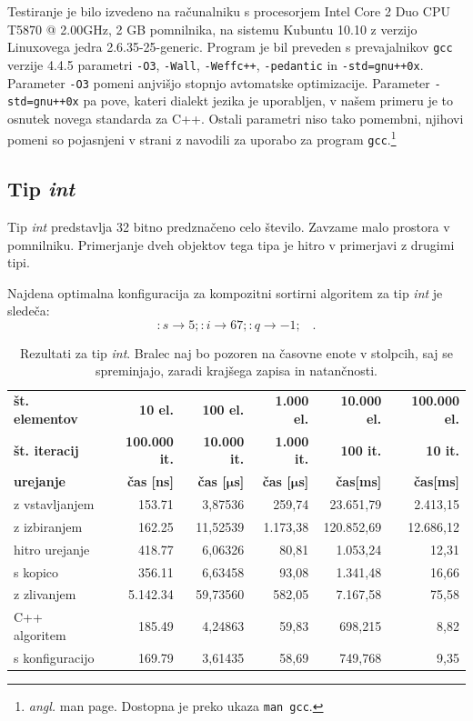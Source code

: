 \documentclass[a4paper,oneside,12pt]{article}
\newcommand{\lra}{\ensuremath{\longrightarrow}}
\newcommand{\edot}{\;\;\;.}
\newcommand{\bmu}{\ensuremath{\boldsymbol{\mu}}}
\newcommand{\usec}{\ensuremath{\bmu}s}
\begin{document}
Testiranje je bilo izvedeno na računalniku s procesorjem Intel\textregistered{} Core\texttrademark{}
2 Duo CPU T5870 @ 2.00GHz, 2 GB pomnilnika, na sistemu Kubuntu 10.10 z verzijo Linuxovega jedra 2.6.35-25-generic.
Program je bil preveden s prevajalnikov \texttt{gcc} verzije 4.4.5 parametri \texttt{-O3},
\texttt{-Wall}, \texttt{-Weffc++}, \texttt{-pedantic} in \texttt{-std=gnu++0x}.
Parameter \texttt{-O3} pomeni anjvišjo stopnjo avtomatske optimizacije. Parameter \texttt{-std=gnu++0x} 
pa pove, kateri dialekt jezika je uporabljen, v našem primeru je to osnutek novega standarda za C++.
Ostali parametri niso tako pomembni, njihovi pomeni so pojasnjeni v strani z navodili za uporabo za program 
\texttt{gcc}.\footnote{\emph{angl.} man page. Dostopna je preko ukaza \texttt{man gcc}.}
 
\subsection{Tip \emph{int}}
Tip \emph{int} predstavlja 32 bitno predznačeno celo število. Zavzame malo prostora v 
pomnilniku. Primerjanje dveh objektov tega tipa je hitro v primerjavi z drugimi tipi.

Najdena optimalna konfiguracija za kompozitni sortirni algoritem za tip \emph{int} je sledeča:
\[ :s \lra 5;:i \lra 67;:q \lra -1; \edot \]

\begin{table}[h]
  \caption[Rezultati za tip \emph{int}]{Rezultati za tip \emph{int}. Bralec naj bo pozoren na časovne enote
  v stolpcih, saj se spreminjajo, zaradi krajšega zapisa in natančnosti.}
  \label{tab:rez:int} \vspace{1ex}
  \begin{tabular}{l!{\vrule width 1pt}r|r|r|r|r}
    \bf št. elementov    & \bf 10 el.& \bf 100 el.& \bf 1.000 el. & \bf 10.000 el. & \bf 100.000 el. \\ 
    \bf št. iteracij     & \bf 100.000 it. & \bf 10.000 it. & \bf 1.000 it. & \bf 100 it. &  \bf 10 it.\\ \hline
    \bf urejanje         & \bf čas [ns] & \bf čas [\usec] & \bf čas [\usec] & \bf čas[ms] & \bf čas[ms] \\  
    z vstavljanjem       &   153.71 &  3,87536 &  259,74  &  23.651,79  &  2.413,15 \\ \hline
    z izbiranjem         &   162.25 & 11,52539 & 1.173,38 & 120.852,69  & 12.686,12 \\ \hline
    hitro urejanje       &   418.77 &  6,06326 &   80,81  &   1.053,24  &     12,31 \\ \hline
    s kopico             &   356.11 &  6,63458 &   93,08  &   1.341,48  &     16,66 \\ \hline
    z zlivanjem          & 5.142.34 & 59,73560 &  582,05  &   7.167,58  &     75,58 \\ \hline
    C++ algoritem        &   185.49 &  4,24863 &   59,83  &    698,215  &      8,82 \\ \hline
    s konfiguracijo        &   169.79 &  3,61435 &   58,69  &    749,768  &      9,35 \\ 
  \end{tabular}
\end{table}
\end{document}
